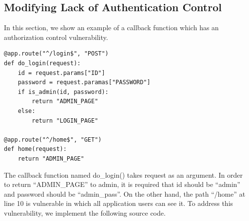 \documentclass[conference]{IEEEtran}
\begin{document}

\subsection{Modifying Lack of Authentication Control}
In this section, we show an example of a callback function which has an authorization control vulnerability.
\begin{lstlisting}[caption={A vulnerable function which has an authentication leak.}, label=code:decorator, captionpos=b]
@app.route("^/login$", "POST")
def do_login(request):
    id = request.params["ID"]
    password = request.paramas["PASSWORD"]
    if is_admin(id, password):
        return "ADMIN_PAGE"
    else:
        return "LOGIN_PAGE"

@app.route("^/home$", "GET")
def home(request):
    return "ADMIN_PAGE"
\end{lstlisting}
The callback function named do\_login() takes request as an argument.
In order to return “ADMIN\_PAGE” to admin, it is required that id should be “admin” and password should be “admin\_pass”.
On the other hand, the path “/home” at line 10 is vulnerable in which all application users can see it.
To address this vulnerability, we implement the following source code.
\end{document}
